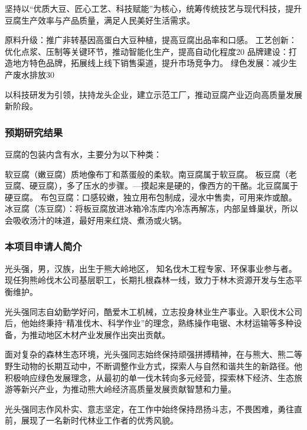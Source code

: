 \documentclass{nsfc}
\begin{document}
坚持以“优质大豆、匠心工艺、科技赋能”为核心，统筹传统技艺与现代科技，提升豆腐生产效率与产品质量，满足人民美好生活需求。


原料升级：推广非转基因高蛋白大豆种植，提高豆腐出品率和口感。
工艺创新：优化点浆、压制等关键环节，推动智能化生产，提高自动化程度20%
品牌建设：打造地方特色品牌，拓展线上线下销售渠道，提升市场竞争力。
绿色发展：减少生产废水排放30%


以科技研发为引领，扶持龙头企业，建立示范工厂，推动豆腐产业迈向高质量发展新阶段。

\subsubsection{预期研究结果}
豆腐的包装内含有水，主要分为以下种类：

软豆腐（嫩豆腐）质地像布丁和蒸蛋般的柔软。南豆腐属于软豆腐。
板豆腐（老豆腐、硬豆腐），多了压水的步骤。—摸起来是硬的，像西方的干酪。北豆腐属于硬豆腐。
布包豆腐：口感较嫩，独立用布包制成，浸水中售卖，可用来炸或酿。
冰豆腐（冻豆腐）：将板豆腐放进冰箱冷冻库内冷冻再解冻，内部呈蜂巢状，所以会吸收汤汁的味道，最好用来红烧、煮汤或火锅。




\subsubsection{本项目申请人简介}
光头强，男，汉族，出生于熊大岭地区，
知名伐木工程专家、环保事业参与者。现任狗熊岭伐木公司基层职工，长期扎根森林一线，致力于林木资源开发与生态平衡维护。

光头强同志自幼勤学好问，酷爱木工机械，立志投身林业生产事业。入职伐木公司后，他始终秉持“精准伐木、科学作业”的理念，熟练操作电锯、木材运输等多种设备，为推动地区木材产业发展作出突出贡献。

面对复杂的森林生态环境，光头强同志始终保持顽强拼搏精神，在与熊大、熊二等野生动物的长期互动中，不断调整作业方式，探索人与自然和谐共生的新路径。他积极响应绿色发展理念，从最初的单一伐木转向多元经营，探索林下经济、生态旅游等新兴产业，为推动熊大岭经济高质量发展贡献智慧和力量。

光头强同志作风朴实、意志坚定，在工作中始终保持昂扬斗志，不畏困难，勇往直前，展现了一名新时代林业工作者的优秀风貌。
\end{document}
